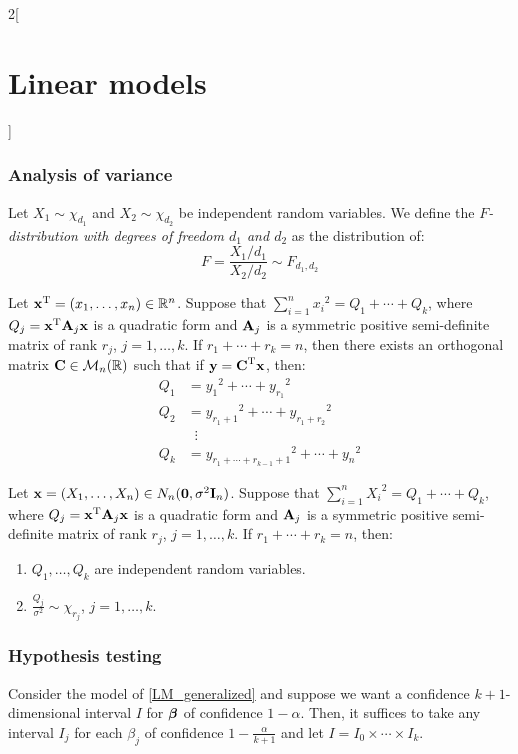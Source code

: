\documentclass[../../../main_math.tex]{subfiles}
\begin{document}
\begin{multicols}{2}[\section{Linear models}]
  \subsubsection{Analysis of variance}
  \begin{definition}
    Let $X_1\sim{\chi_{d_1}}$ and $X_2\sim{\chi_{d_2}}$ be independent random variables. We define the \emph{$F$-distribution with degrees of freedom $d_1$ and $d_2$} as the distribution of: $$F=\frac{X_1/d_1}{X_2/d_2}\sim F_{d_1, d_2}$$
  \end{definition}
  \begin{lemma}
    Let ${\boldsymbol{\mathrm{x}}}^{\mathrm{T}}=(x_1,\ldots,x_n)\in\mathbb{R}^n$. Suppose that $\sum_{i=1}^n {x_i}^2=Q_1+\cdots+Q_k$, where $Q_j={\boldsymbol{\mathrm{x}}}^{\mathrm{T}}\boldsymbol{\mathrm{A}}_j\boldsymbol{\mathrm{x}}$ is a quadratic form and $\boldsymbol{\mathrm{A}}_j$ is a symmetric positive semi-definite matrix of rank $r_j$, $j=1,\ldots,k$. If $r_1+\cdots+r_k=n$, then there exists an orthogonal matrix $\boldsymbol{\mathrm{C}}\in\mathcal{M}_n(\mathbb{R})$ such that if $\boldsymbol{\mathrm{y}}={\boldsymbol{\mathrm{C}}}^{\mathrm{T}}\boldsymbol{\mathrm{x}}$, then:
    \begin{equation*}
      \begin{aligned}
        Q_1 & = {y_1}^2+\cdots+{y_{r_1}}^2                    \\
        Q_2 & = {y_{r_1+1}}^2+\cdots+{y_{r_1+r_2}}^2          \\
            & \;\;\vdots                                      \\
        Q_k & = {y_{r_1+\cdots+r_{k-1}+1}}^2+\cdots+{y_{n}}^2
      \end{aligned}
    \end{equation*}
  \end{lemma}
  \begin{theorem}
    Let $\boldsymbol{\mathrm{x}}=(X_1,\ldots,X_n)\in N_n(\boldsymbol{\mathrm{0}},\sigma^2\boldsymbol{\mathrm{I}}_n)$. Suppose that $\sum_{i=1}^n {X_i}^2=Q_1+\cdots+Q_k$, where $Q_j={\boldsymbol{\mathrm{x}}}^{\mathrm{T}}\boldsymbol{\mathrm{A}}_j\boldsymbol{\mathrm{x}}$ is a quadratic form and $\boldsymbol{\mathrm{A}}_j$ is a symmetric positive semi-definite matrix of rank $r_j$, $j=1,\ldots,k$. If $r_1+\cdots+r_k=n$, then:
    \begin{enumerate}
      \item $Q_1,\ldots,Q_k$ are independent random variables.
      \item $\frac{Q_j}{\sigma^2}\sim{\chi_{r_j}}$, $j=1,\ldots,k$.
    \end{enumerate}
  \end{theorem}
  \subsubsection{Hypothesis testing}
  \begin{proposition}
    Consider the model of \cref{LM_generalized} and suppose we want a confidence $k+1$-dimensional interval $I$ for $\boldsymbol{\mathrm{\beta}}$ of confidence $1-\alpha$. Then, it suffices to take any interval $I_j$ for each $\beta_j$ of confidence $1-\frac{\alpha}{k+1}$ and let $I=I_0\times\cdots\times I_{k}$.
  \end{proposition}
\end{multicols}
\end{document}
